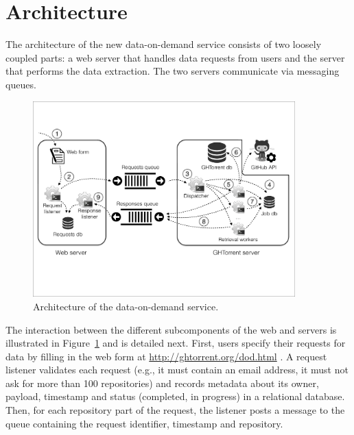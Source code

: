
\section{Architecture}
\label{sec:arch}

The architecture of the new \ght data-on-demand service consists of two loosely coupled parts:
a web server that handles data requests from users and the \ght server that performs the data extraction.
The two servers communicate via messaging queues.

\begin{figure}[t]
\begin{center}
\includegraphics[width=0.9\textwidth, trim=5 160 5 105, clip=True]{figures/architecture.pdf}
\caption{Architecture of the \ght data-on-demand service.}
\label{fig:architecture}
\end{center}
\end{figure}

The interaction between the different subcomponents of the web and \ght servers is illustrated in
Figure~\ref{fig:architecture} and is detailed next.
First, users specify their requests for data by filling in the web form at \url{http://ghtorrent.org/dod.html} .
A request listener validates each request (e.g., it must contain an email address, it must not ask for
more than 100 repositories)
and records metadata about its owner, payload, 
timestamp and status (completed, in progress) in
a relational database.
Then, for each \gh repository part of the request, the listener posts a message to the queue 
containing the request identifier, timestamp and repository.

